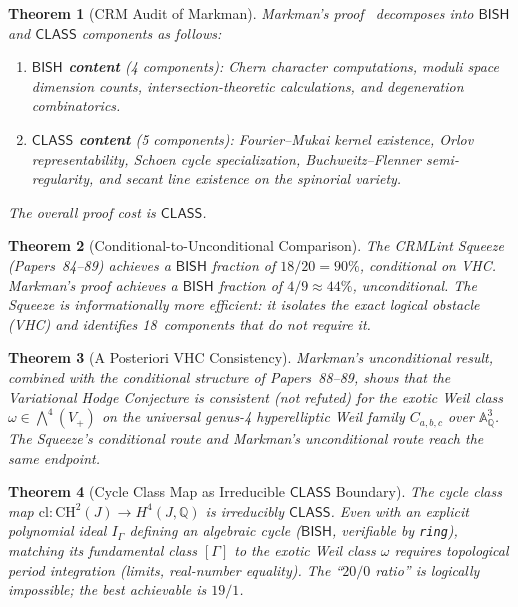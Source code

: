\documentclass[11pt]{article}
\theoremstyle{plain}
\newtheorem{theorem}{Theorem}[section]
\theoremstyle{definition}
\theoremstyle{remark}
\newcommand{\QQ}{\mathbb{Q}}
\newcommand{\Aff}{\mathbb{A}}
\newcommand{\CH}{\mathrm{CH}}
\newcommand{\BISH}{\mathsf{BISH}}
\newcommand{\CLASS}{\mathsf{CLASS}}
\begin{document}
\begin{theorem}[CRM Audit of Markman]\label{thm:A}
Markman's proof~\cite{markman2025} decomposes into $\BISH$ and
$\CLASS$ components as follows:
\begin{enumerate}[label=(\roman*),nosep]
\item \textbf{$\BISH$ content} (4 components): Chern character
  computations, moduli space dimension counts, intersection-theoretic
  calculations, and degeneration combinatorics.
\item \textbf{$\CLASS$ content} (5 components): Fourier--Mukai kernel
  existence, Orlov representability, Schoen cycle specialization,
  Buchweitz--Flenner semi-regularity, and secant line existence on
  the spinorial variety.
\end{enumerate}
The overall proof cost is $\CLASS$.
\end{theorem}

\begin{theorem}[Conditional-to-Unconditional Comparison]\label{thm:B}
The CRMLint Squeeze (Papers~84--89) achieves a $\BISH$ fraction of
$18/20 = 90\%$, conditional on VHC.  Markman's proof achieves a
$\BISH$ fraction of $4/9 \approx 44\%$, unconditional.  The Squeeze
is informationally more efficient: it isolates the exact logical
obstacle (VHC) and identifies 18~components that do not require it.
\end{theorem}

\begin{theorem}[A Posteriori VHC Consistency]\label{thm:C}
Markman's unconditional result, combined with the conditional
structure of Papers~88--89, shows that the Variational Hodge
Conjecture is \emph{consistent} (not refuted) for the exotic Weil
class $\omega \in \bigwedge^4(V_+)$ on the universal genus-4
hyperelliptic Weil family $C_{a,b,c}$ over $\Aff^3_\QQ$.  The
Squeeze's conditional route and Markman's unconditional route reach
the same endpoint.
\end{theorem}

\begin{theorem}[Cycle Class Map as Irreducible $\CLASS$ Boundary]
\label{thm:D}
The cycle class map $\mathrm{cl}: \CH^2(J) \to H^4(J, \QQ)$ is
irreducibly $\CLASS$.  Even with an explicit polynomial ideal
$I_\Gamma$ defining an algebraic cycle ($\BISH$, verifiable by
\texttt{ring}), matching its fundamental class $[\Gamma]$ to the
exotic Weil class $\omega$ requires topological period integration
(limits, real-number equality).  The ``$20/0$ ratio'' is logically
impossible; the best achievable is $19/1$.
\end{theorem}
\end{document}
